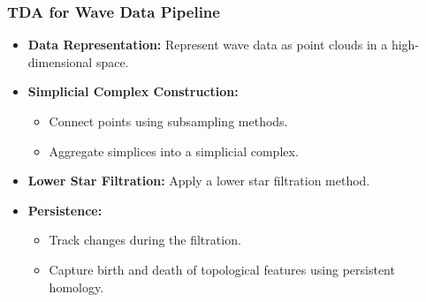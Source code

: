 \documentclass{beamer}
\begin{document}
\begin{frame}
  \frametitle{TDA for Wave Data Pipeline}

  \begin{itemize}
    \setlength\itemsep{1em} %
    \item \textbf{Data Representation:} Represent wave data as point clouds in a high-dimensional space.
    \item \textbf{Simplicial Complex Construction:}
      \begin{itemize}
        \setlength\itemsep{0.5em} %
        \item Connect points using subsampling methods.
        \item Aggregate simplices into a simplicial complex.
      \end{itemize}
    \item \textbf{Lower Star Filtration:} Apply a lower star filtration method.
    \item \textbf{Persistence:}
      \begin{itemize}
        \setlength\itemsep{0.5em} %
        \item Track changes during the filtration.
        \item Capture birth and death of topological features using persistent homology.
      \end{itemize}
  \end{itemize}
\end{frame}
\end{document}
